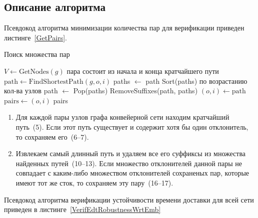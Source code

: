 \documentclass[a4paper]{article}
\begin{document}
\subsection{Описание алгоритма}

Псевдокод алгоритма минимизации количества пар для верификации приведен
листинге~\ref{GetPairs}.

\begin{listing}[H]
\caption{Поиск множества пар}\label{GetPairs}
\begin{algorithmic}[1]
    \State $V \gets \text{GetNodes}(g)$
    \State \Comment пара состоит из начала и конца кратчайшего пути
        \State $\text{path} \gets \text{FindShortestPath}(g, o, i)$
            \State paths $\gets$ path
        \EndIf
    \EndFor
    \State
    \State Sort(paths) \Comment по возрастанию кол-ва узлов
        \State path $\gets$ Pop(paths)
        \State RemoveSuffixes(path, paths)
        \State $(o, i) \gets \text{path}$
        \State $\text{pairs} \gets (o, i)$
        \EndIf
    \EndWhile
    \State
    \State \Return pairs
\EndFunction
\end{algorithmic}
\end{listing}

\begin{enumerate}
    \item Для каждой пары узлов графа конвейерной сети находим кратчайший
        путь~(5). Если этот путь существует и содержит хотя бы один
        отклонитель, то сохраняем его~(6--7).

    \item Извлекаем самый длинный путь и удаляем все его суффиксы из множества
        найденных путей~(10--13). Если множество отклонителей данной пары не
        совпадает с каким-либо множеством отклонителей сохраненых пар, которые
        имеют тот же сток, то сохраняем эту пару~(16--17).
\end{enumerate}

Псевдокод алгоритма верификации устойчивости времени доставки для всей сети
приведен в листинге~\ref{VerifEdtRobustnessWrtEmb}
\end{document}
